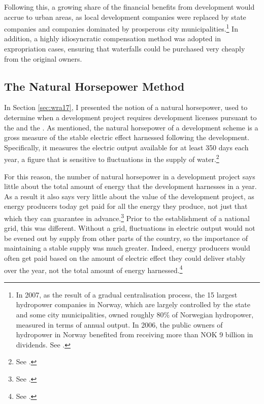 Following this, a growing share of the financial benefits from development would accrue to urban areas, as local development companies were replaced by state companies and companies dominated by prosperous city municipalities.\footnote{In 2007, as the result of a gradual centralisation process, the 15 largest hydropower companies in Norway, which are largely controlled by the state and some city municipalities, owned roughly 80\% of Norwegian hydropower, measured in terms of annual output. In 2006, the public owners of hydropower in Norway benefited from receiving more than NOK 9 billion in dividends. See \cite[28]{otprp61}.} In addition, a highly idiosyncratic compensation method was adopted in expropriation cases, ensuring that waterfalls could be purchased very cheaply from the original owners.

\subsection{The Natural Horsepower Method}\label{sec:5:4:1}

In Section \ref{sec:wra17}, I presented the notion of a natural horsepower, used to determine when a development project requires development licenses pursuant to the \cite{wra17} and the \cite{ica17}. As mentioned, the natural horsepower of a development scheme is a gross measure of the stable electric effect harnessed following the development. Specifically, it measures the electric output available for at least 350 days each year, a figure that is sensitive to fluctuations in the supply of water.\footnote{See \cite{sofienlund07}.} 

For this reason, the number of natural horsepower in a development project says little about the total amount of energy that the development harnesses in a year. As a result it also says very little about the value of the development project, as energy producers today get paid for all the energy they produce, not just that which they can guarantee in advance.\footnote{See \cite[83-84]{uleberg08}.} Prior to the establishment of a national grid, this was different. Without a grid, fluctuations in electric output would not be evened out by supply from other parts of the country, so the importance of maintaining a stable supply was much greater. Indeed, energy producers would often get paid based on the amount of electric effect they could deliver stably over the year, not the total amount of energy harnessed.\footnote{See \cite[83]{uleberg08}.}

